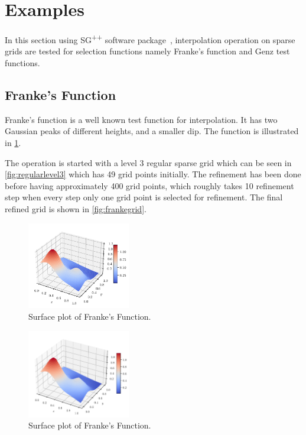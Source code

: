 
\section{Examples}\label{sec:example}

In this section using SG\textsuperscript{++} software package~\cite{pflueger10spatially},
interpolation operation on sparse grids are tested for selection functions namely
Franke's function and Genz test functions.

\subsection{Franke's Function}\label{subsec:frankeexample}

Franke's function is a well known test function for interpolation.
It has two Gaussian peaks of different heights, and a smaller dip.
The function is illustrated in \cref{fig:fullfranke}.

The operation is started with a level 3 regular sparse grid which can be seen
in \cref{fig:regularlevel3} which has 49 grid points initially. The refinement
has been done before having approximately 400 grid points, which roughly
takes 10 refinement step when every step only one grid point is selected
for refinement. The final refined grid is shown in \cref{fig:frankegrid}.

\begin{figure}
    \centering
    \includegraphics[width=0.4\textwidth]{figures/franke.pdf}
    \caption{Surface plot of Franke's Function.}
    \label{fig:fullfranke}
\end{figure}

\begin{figure}
    \centering
    \includegraphics[width=0.4\textwidth]{figures/SurfacePlot.pdf}
    \caption{Surface plot of Franke's Function.}
    \label{fig:interpolatedfranke}
\end{figure}

